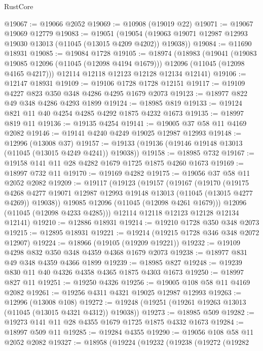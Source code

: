 \begin{lexlean}{RustCore}
\begin{coremodule}
@19067 := @19066 @2052
@19069 := @10908 (@19019 @22)
@19071 := @19067 @19069 @12779
@19083 := @19051
    (@19054 (@19063 @19071 @12987 @12993 @19030 @13013 (@11045 (@13015 @4209 @4202)) @19038))
@19084 := @11690 @18931
@19085 := @19084 @1728
@19105 := @18974
    (@18983
      (@19041
        (@19083 @19085 @12096 (@11045 (@12098 @4194 @1679)))
        @12096
        (@11045 (@12098 @4165 @4217)))
      @12114
      @12118
      @12123
      @12128
      @12134
      @12141)
@19106 := @12147 @18931
@19109 := @19106 @1728 @1728 @12151
@19117 := @19109 @4227 @823 @350 @348 @4286 @4295 @1679 @2073
@19123 := @18977 @822 @49 @348 @4286 @4293 @1899
@19124 := @18985 @819
@19133 := @19124 @821 @11 @40 @4254 @4285 @4292 @1875 @4232 @1673
@19135 := @18997 @819 @11
@19136 := @19135 @4254
@19141 := @19005 @37 @58 @11 @4169 @2082
@19146 := @19141 @4240 @4249 @19025 @12987 @12993
@19148 := @12996 (@13008 @37)
@19157 := @19133 (@19136 (@19146 @19148 @13013 (@11045 (@13015 @4249 @4241)) @19038))
@19158 := @18985 @732
@19167 := @19158 @141 @11 @28 @4282 @1679 @1725 @1875 @4260 @1673
@19169 := @18997 @732 @11
@19170 := @19169 @4282
@19175 := @19056 @37 @58 @11 @2052 @2082
@19209 := @19117
    (@19123
      (@19157
        (@19167
          (@19170
            (@19175
              @4268
              @4277
              @19071
              @12987
              @12993
              @19148
              @13013
              (@11045 (@13015 @4277 @4269))
              @19038))
          @19085
          @12096
          (@11045 (@12098 @4261 @1679)))
        @12096
        (@11045 (@12098 @4233 @4285)))
      @12114
      @12118
      @12123
      @12128
      @12134
      @12141)
@19210 := @12886 @18931
@19214 := @19210 @1728 @350 @348 @2073
@19215 := @12895 @18931
@19221 := @19214 (@19215 @1728 @346 @348 @2072 @12907)
@19224 := @18966 (@19105 (@19209 @19221))
@19232 := @19109 @4298 @832 @350 @348 @4359 @4368 @1679 @2073
@19238 := @18977 @831 @49 @348 @4359 @4366 @1899
@19239 := @18985 @827
@19248 := @19239 @830 @11 @40 @4326 @4358 @4365 @1875 @4303 @1673
@19250 := @18997 @827 @11
@19251 := @19250 @4326
@19256 := @19005 @108 @58 @11 @4169 @2082
@19261 := @19256 @4311 @4321 @19025 @12987 @12993
@19263 := @12996 (@13008 @108)
@19272 := @19248 (@19251 (@19261 @19263 @13013 (@11045 (@13015 @4321 @4312)) @19038))
@19273 := @18985 @509
@19282 := @19273 @141 @11 @28 @4355 @1679 @1725 @1875 @4332 @1673
@19284 := @18997 @509 @11
@19285 := @19284 @4355
@19290 := @19056 @108 @58 @11 @2052 @2082
@19327 := @18958
    (@19224
      (@19232
        (@19238
          (@19272
            (@19282

\end{coremodule}
\end{lexlean}
